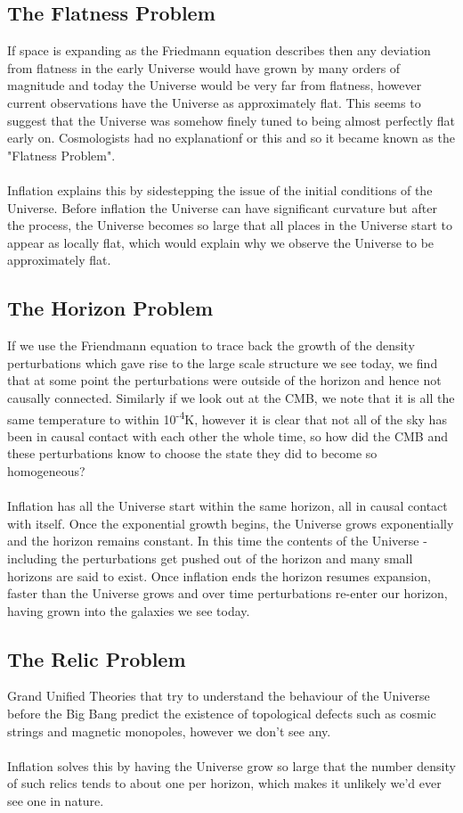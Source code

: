 \documentclass[12pt]{report}
\begin{document}
\subsection{The Flatness Problem}
If space is expanding as the Friedmann equation describes then any deviation from flatness in the early Universe would have grown by many orders of magnitude and today the Universe would be very far from flatness, however current observations have the Universe as approximately flat. This seems to suggest that the Universe was somehow finely tuned to being almost perfectly flat early on. Cosmologists had no explanationf or this and so it became known as the "Flatness Problem".
\\\\
Inflation explains this by sidestepping the issue of the initial conditions of the Universe. Before inflation the Universe can have significant curvature but after the process, the Universe becomes so large that all places in the Universe start to appear as locally flat, which would explain why we observe the Universe to be approximately flat.

\subsection{The Horizon Problem}
If we use the Friendmann equation to trace back the growth of the density perturbations which gave rise to the large scale structure we see today, we find that at some point the perturbations were outside of the horizon and hence not causally connected. Similarly if we look out at the CMB, we note that it is all the same temperature to within 10\textsuperscript{-4}K, however it is clear that not all of the sky has been in causal contact with each other the whole time, so how did the CMB and these perturbations know to choose the state they did to become so homogeneous?
\\\\
Inflation has all the Universe start within the same horizon, all in causal contact with itself. Once the exponential growth begins, the Universe grows exponentially and the horizon remains constant. In this time the contents of the Universe - including the perturbations get pushed out of the horizon and many small horizons are said to exist. Once inflation ends the horizon resumes expansion, faster than the Universe grows and over time perturbations re-enter our horizon, having grown into the galaxies we see today.

\subsection{The Relic Problem}
Grand Unified Theories that try to understand the behaviour of the Universe before the Big Bang predict the existence of topological defects such as cosmic strings and magnetic monopoles, however we don't see any.
\\\\
Inflation solves this by having the Universe grow so large that the number density of such relics tends to about one per horizon, which makes it unlikely we'd ever see one in nature.
\end{document}
